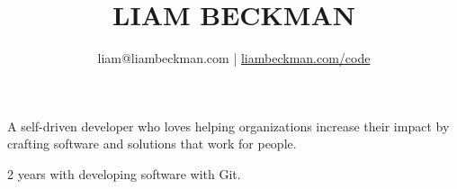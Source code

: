 


\title{\textcolor{my-red}{LIAM BECKMAN}}
\author{liam@liambeckman.com | \href{https://liambeckman.com/code}{liambeckman.com/code}}

\date{\vspace{-5ex}}



\maketitle

\begin{center}
A self-driven developer who loves helping organizations increase their impact by crafting software and solutions that work for people.
\end{center}





\vspace{-1em}
\begin{itemize}[label=$\triangleright$]
    2 years with developing software with Git.
\end{itemize}

\medbreak









\vfill




